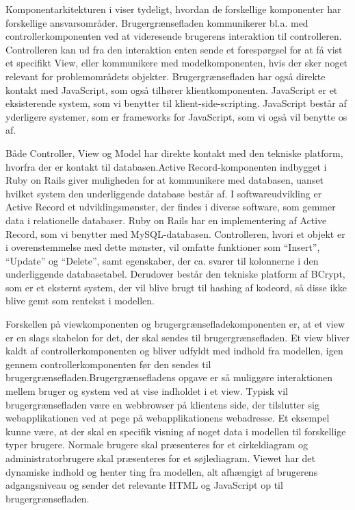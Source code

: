 Komponentarkitekturen i  viser tydeligt, hvordan de forskellige komponenter har forskellige ansvarsområder. Brugergrænsefladen kommunikerer bl.a. med controllerkomponenten ved at videresende brugerens interaktion til controlleren. Controlleren kan ud fra den interaktion enten sende et forespørgsel for at få vist et specifikt View, eller kommunikere med modelkomponenten, hvis der sker noget relevant for problemområdets objekter. Brugergrænsefladen har også direkte kontakt med JavaScript, som også tilhører klientkomponenten.  JavaScript er et eksisterende system, som vi benytter til klient-side-scripting. JavaScript består af yderligere systemer, som er frameworks for JavaScript, som vi også vil benytte os af.

Både Controller, View og Model har direkte kontakt med den tekniske platform, hvorfra der er kontakt til databasen.Active Record-komponenten indbygget i Ruby on Rails giver muligheden for at kommunikere med databasen, uanset hvilket system den underliggende database består af. I softwareudvikling er Active Record et udviklingsmønster, der findes i diverse software, som gemmer data i relationelle databaser. Ruby on Rails har en implementering af Active Record, som vi benytter med MySQL-databasen. Controlleren, hvori et objekt er i overenstemmelse med dette mønster, vil omfatte funktioner som ``Insert'', ``Update'' og ``Delete'', samt egenskaber, der ca. svarer til kolonnerne i den underliggende databasetabel.\cite{activerecordwiki} Derudover består den tekniske platform af BCrypt, som er et eksternt system, der vil blive brugt til hashing af kodeord, så disse ikke blive gemt som rentekst i modellen.

Forskellen på viewkomponenten og brugergrænsefladekomponenten er, at et view er en slags skabelon for det, der skal sendes til brugergrænsefladen. Et view bliver kaldt af controllerkomponenten og bliver udfyldt med indhold fra modellen, igen gennem controllerkomponenten før den sendes til brugergrænsefladen.Brugergrænsefladens opgave er så muliggøre interaktionen mellem bruger og system ved at vise indholdet i et view. Typisk vil brugergrænsefladen være en webbrowser på klientens side, der tilslutter sig webapplikationen ved at pege på webapplikationens webadresse. Et eksempel kunne være, at der skal en specifik visning af noget data i modellen til forskellige typer brugere. Normale brugere skal præsenteres for et cirkeldiagram og administratorbrugere skal præsenteres for et søjlediagram. Viewet har det dynamiske indhold og henter ting fra modellen, alt afhængigt af brugerens adgangsniveau og sender det relevante HTML og JavaScript op til brugergrænsefladen. 

